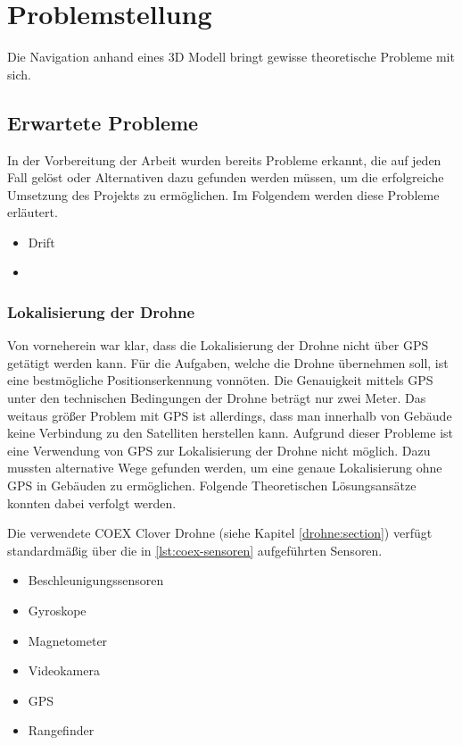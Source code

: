 \chapter{Problemstellung}

Die Navigation anhand eines 3D Modell bringt gewisse theoretische Probleme mit sich.





\section{Erwartete Probleme} \label{erwartete_probleme:section}

In der Vorbereitung der Arbeit wurden bereits Probleme erkannt, die auf jeden Fall gelöst oder Alternativen dazu gefunden werden müssen, um die erfolgreiche Umsetzung des Projekts zu ermöglichen. Im Folgendem werden diese Probleme erläutert.

\begin{itemize}
    \item{Drift}
    \item 
\end{itemize}

\subsection{Lokalisierung der Drohne} \label{lokalisierung_der_drohne:subsection}

Von vorneherein war klar, dass die Lokalisierung der Drohne nicht über \ac{GPS} getätigt werden kann. Für die Aufgaben, welche die Drohne übernehmen soll, ist eine bestmögliche Positionserkennung vonnöten. Die Genauigkeit mittels \ac{GPS} unter den technischen Bedingungen der Drohne beträgt nur zwei Meter. Das weitaus größer Problem mit \ac{GPS} ist allerdings, dass man innerhalb von Gebäude keine Verbindung zu den Satelliten herstellen kann. Aufgrund dieser Probleme ist eine Verwendung von \ac{GPS} zur Lokalisierung der Drohne nicht möglich. Dazu mussten alternative Wege gefunden werden, um eine genaue Lokalisierung ohne \ac{GPS} in Gebäuden zu ermöglichen. Folgende Theoretischen Lösungsansätze konnten dabei verfolgt werden.

Die verwendete COEX Clover Drohne (siehe Kapitel \ref{drohne:section}) verfügt standardmäßig über die in \ref{lst:coex-sensoren} aufgeführten Sensoren.

\begin{center}
\begin{itemize}
    \item Beschleunigungssensoren 
    \item Gyroskope
    \item Magnetometer
    \item Videokamera
    \item GPS
    \item Rangefinder
\end{itemize}
\label{lst:coex-sensoren}
\end{center}

